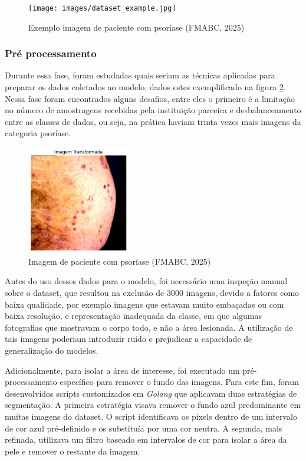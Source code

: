 \begin{figure}[h] %
    \centering
    \texttt{[image: images/dataset\_example.jpg]}
    \caption{Exemplo imagem de paciente com psoríase (FMABC, 2025)}
    \label{fig:ex-dataset}
\end{figure}

\subsubsection{Pré processamento}

Durante essa fase, foram estudadas quais seriam as técnicas aplicadas para preparar os dados coletados ao modelo, dados estes exemplificado na figura \ref{fig:ex-dataset}. Nessa fase foram encontrados alguns desafios, entre eles o primeiro é a limitação no número de amostragens recebidas pela instituição parceira e desbalanceamento entre as classes de dados, ou seja, na prática haviam trinta vezes mais imagens da categoria psoríase.

\begin{figure}[h] %
    \centering
    \includegraphics[width=0.4\textwidth]{images/pre_processamento_psoriasis_jitter.png}
    \caption{Imagem de paciente com psoríase (FMABC, 2025)}
    \label{fig:ex-dataset}
\end{figure}

Antes do uso desses dados para o modelo, foi necessário uma inspeção manual sobre o dataset, que resultou na exclusão de 3000 imagens, devido a fatores como baixa qualidade, por exemplo imagens que estavam muito embaçadas ou com baixa resolução, e representação inadequada da classe, em que algumas fotografias que mostravam o corpo todo, e não a área lesionada. A utilização de tais imagens poderiam introduzir ruído e prejudicar a capacidade de generalização do modelos. 

Adicionalmente, para isolar a área de interesse, foi executado um pré-processamento específico para remover o fundo das imagens. Para este fim, foram desenvolvidos scripts customizados em \textit{Golang} que aplicavam duas estratégias de segmentação. A primeira estratégia visava remover o fundo azul predominante em muitas imagens do dataset. O script identificava os pixels dentro de um intervalo de cor azul pré-definido e os substituía por uma cor neutra. A segunda, mais refinada, utilizava um filtro baseado em intervalos de cor para isolar a área da pele e remover o restante da imagem.

